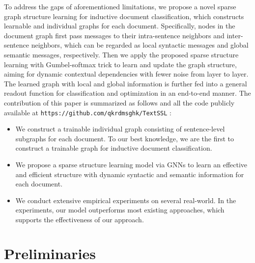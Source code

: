 \documentclass[letterpaper]{article} %
\begin{document}
To address the gaps of aforementioned limitations, we propose a novel sparse graph structure learning for inductive document classification, which constructs learnable and individual graphs for each document.
Specifically, nodes in the document graph first pass messages to their intra-sentence neighbors and inter-sentence neighbors, which can be regarded as local syntactic messages and global semantic messages, respectively. Then we apply the proposed sparse structure learning with Gumbel-softmax trick to learn and update the graph structure, aiming for dynamic contextual dependencies with fewer noise from layer to layer. The learned graph with local and global information is further fed into a general readout function for classification and optimization in an end-to-end manner.
The contribution of this paper is summarized as follows and all the code
publicly available at \texttt{https://github.com/qkrdmsghk/TextSSL} :
\begin{itemize}
\item We construct a trainable individual graph consisting of sentence-level subgraphs for each document. To our best knowledge, we are the first to construct a trainable graph for inductive document classification. 
\item We propose a sparse structure learning model via GNNs to learn an effective and efficient structure with dynamic syntactic and semantic information for each document. 
\item We conduct extensive empirical experiments on several real-world. In the experiments, our model outperforms most existing approaches, which supports the effectiveness of our approach.
\end{itemize}

\section{Preliminaries}
\label{sec:pre}
\end{document}
